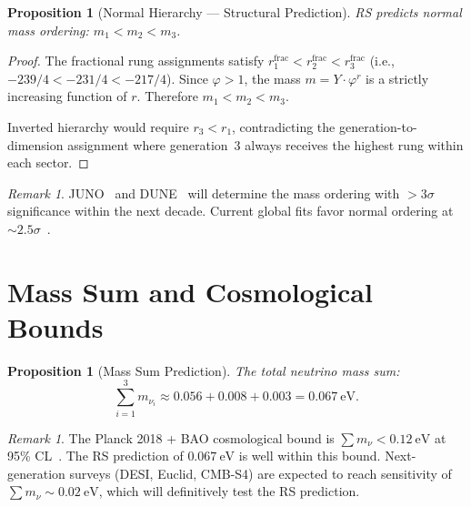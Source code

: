 \documentclass[12pt,a4paper]{article}
\newtheorem{proposition}[theorem]{Proposition}
\theoremstyle{definition}
\theoremstyle{remark}
\newtheorem{remark}[theorem]{Remark}
\begin{document}
\begin{proposition}[Normal Hierarchy --- Structural Prediction]
\label{thm:normal}
RS predicts normal mass ordering:
$m_1 < m_2 < m_3$.
\end{proposition}

\begin{proof}
The fractional rung assignments satisfy
$r_1^{\mathrm{frac}} < r_2^{\mathrm{frac}} <
r_3^{\mathrm{frac}}$ (i.e., $-239/4 < -231/4 < -217/4$).
Since $\varphi > 1$, the mass $m = Y \cdot \varphi^r$ is
a strictly increasing function of $r$.  Therefore
$m_1 < m_2 < m_3$.

Inverted hierarchy would require $r_3 < r_1$, contradicting
the generation-to-dimension assignment where generation~3
always receives the highest rung within each sector.
\end{proof}

\begin{remark}
JUNO~\cite{JUNO} and DUNE~\cite{DUNE} will determine the
mass ordering with $> 3\sigma$ significance within the next
decade.  Current global fits favor normal ordering at
$\sim 2.5\sigma$~\cite{NuFIT}.
\end{remark}

\section{Mass Sum and Cosmological Bounds}
\label{sec:sum}

\begin{proposition}[Mass Sum Prediction]
\label{prop:sum}
The total neutrino mass sum:
\begin{equation}
  \sum_{i=1}^{3} m_{\nu_i} \approx 0.056 + 0.008 + 0.003
  = 0.067~\mathrm{eV}.
  \label{eq:sum}
\end{equation}
\end{proposition}

\begin{remark}
The Planck 2018 + BAO cosmological bound is
$\sum m_\nu < 0.12~\mathrm{eV}$ at 95\%
CL~\cite{Planck2020}.  The RS prediction of
$0.067~\mathrm{eV}$ is well within this bound.
Next-generation surveys (DESI, Euclid, CMB-S4) are expected
to reach sensitivity of $\sum m_\nu \sim 0.02~\mathrm{eV}$,
which will definitively test the RS prediction.
\end{remark}

\end{document}
